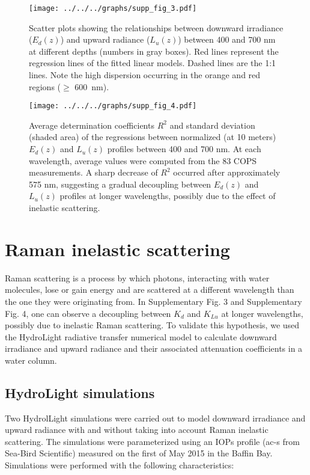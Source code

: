 \documentclass[12pt,a4paper]{scrartcl}
\newcommand{\ked}{\ensuremath{K_{d}}}
\newcommand{\klu}{\ensuremath{K_{Lu}}}
\newcommand{\edz}{\ensuremath{{E_d(z)}}}
\newcommand{\luz}{\ensuremath{{L_u(z)}}}
\begin{document}
\begin{figure}[H]
	\centering
	\texttt{[image: ../../../graphs/supp\_fig\_3.pdf]}
	\caption{Scatter plots showing the relationships between downward irradiance (\edz{}) and upward radiance (\luz{}) between 400 and 700 nm at different depths (numbers in gray boxes). Red lines represent the regression lines of the fitted linear models. Dashed lines are the 1:1 lines. Note the high dispersion occurring in the orange and red regions ($\ge$ 600~nm).}
\end{figure}

\begin{figure}[H]
	\centering
	\texttt{[image: ../../../graphs/supp\_fig\_4.pdf]}
	\caption{Average determination coefficients \(R^2\) and standard deviation (shaded area) of the regressions between normalized (at 10 meters) \edz{} and \luz{} profiles between 400 and 700 nm. At each wavelength, average values were computed from the 83 COPS measurements. A sharp decrease of \(R^2\) occurred after approximately 575 nm, suggesting a gradual decoupling between \edz{} and \luz{} profiles at longer wavelengths, possibly due to the effect of inelastic scattering.}
\end{figure}

\clearpage
\section{Raman inelastic scattering}

Raman scattering is a process by which photons, interacting with water molecules, lose or gain energy and are scattered at a different wavelength than the one they were originating from. In Supplementary Fig. 3 and Supplementary Fig. 4, one can observe a decoupling between \ked{} and \klu{} at longer wavelengths, possibly due to inelastic Raman scattering. To validate this hypothesis, we used the HydroLight radiative transfer numerical model to calculate downward irradiance and upward radiance and their associated attenuation coefficients in a water column.

\subsection{HydroLight simulations}

Two HydrolLight simulations were carried out to model downward irradiance and upward radiance with and without taking into account Raman inelastic scattering. The simulations were parameterized using an IOPs profile (ac-s from Sea-Bird Scientific) measured on the first of May 2015 in the Baffin Bay. Simulations were performed with the following characteristics:
\end{document}
